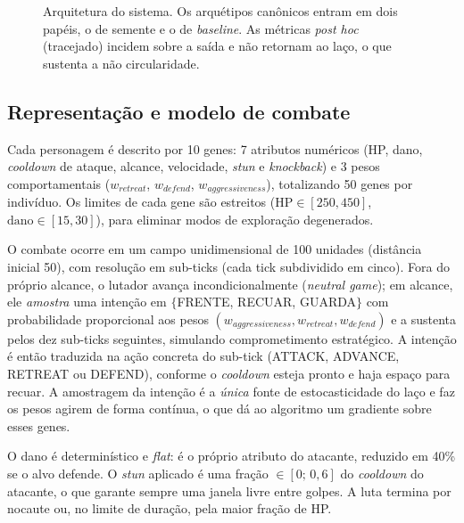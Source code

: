 \documentclass[10pt,conference]{IEEEtran}
\begin{document}
\begin{figure}[!tb]
\caption{Arquitetura do sistema. Os arquétipos canônicos entram em dois papéis, o de
semente e o de \emph{baseline}. As métricas \emph{post hoc} (tracejado) incidem
sobre a saída e não retornam ao laço, o que sustenta a não circularidade.}
\label{fig:arq}
\end{figure}

\subsection{Representação e modelo de combate}

Cada personagem é descrito por 10 genes: 7 atributos numéricos (HP, dano,
\emph{cooldown} de ataque, alcance, velocidade, \emph{stun} e \emph{knockback}) e
3 pesos comportamentais ($w_{retreat}$, $w_{defend}$, $w_{aggressiveness}$),
totalizando 50 genes por indivíduo. Os limites de cada gene são estreitos
($\mathrm{HP}\in[250,450]$, $\mathrm{dano}\in[15,30]$), para eliminar modos de
exploração degenerados.

O combate ocorre em um campo unidimensional de 100 unidades (distância inicial 50),
com resolução em sub-ticks (cada tick subdividido em cinco).
Fora do próprio alcance, o lutador avança incondicionalmente (\emph{neutral game});
em alcance, ele \emph{amostra} uma intenção em $\{$FRENTE, RECUAR, GUARDA$\}$ com
probabilidade proporcional aos pesos
$(w_{aggressiveness}, w_{retreat}, w_{defend})$ e a sustenta pelos dez sub-ticks
seguintes, simulando comprometimento estratégico. A intenção é então traduzida na
ação concreta do sub-tick (ATTACK, ADVANCE, RETREAT ou DEFEND), conforme o
\emph{cooldown} esteja pronto e haja espaço para recuar. A amostragem da intenção é
a \emph{única} fonte de estocasticidade do laço e faz os pesos agirem de forma
contínua, o que dá ao algoritmo um gradiente sobre esses genes.

O dano é determinístico e \emph{flat}: é o próprio atributo do atacante, reduzido
em 40\% se o alvo defende. O \emph{stun} aplicado é uma fração
$\in[0;\,0{,}6]$ do \emph{cooldown} do atacante, o que garante sempre uma janela
livre entre golpes. A luta termina por nocaute ou, no limite de duração, pela maior
fração de HP.
\end{document}
